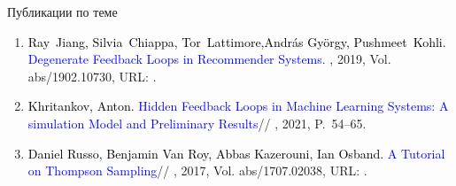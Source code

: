 \documentclass{beamer}
\begin{document}
\begin{frame}{Публикации по теме}
\begin{enumerate}
    \item
      \textcolor{black}{Ray~Jiang, Silvia~Chiappa, Tor~Lattimore,Andr{\'a}s Gy{\"o}rgy, Pushmeet~Kohli.}
      \textcolor{blue}{Degenerate Feedback Loops in Recommender Systems}.
    , 2019, Vol. abs/1902.10730,
	  URL: .

  \item
    \textcolor{black}{Khritankov, Anton.}
    \textcolor{blue}{Hidden Feedback Loops in Machine Learning Systems: A simulation Model and Preliminary Results}//
    , 2021, P.~54--65.

  \item
    \textcolor{black}{Daniel Russo, Benjamin Van Roy, Abbas Kazerouni, Ian Osband.}
    \textcolor{blue}{A Tutorial on Thompson Sampling}//
    , 2017, Vol. abs/1707.02038,
	  URL: .
  \end{enumerate}
\end{frame}
\end{document}
